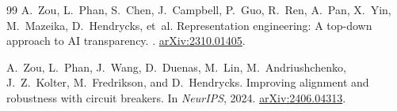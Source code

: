 \documentclass[10pt,twocolumn]{article}
\begin{document}
\begin{thebibliography}{99}
A.~Zou, L.~Phan, S.~Chen, J.~Campbell, P.~Guo, R.~Ren, A.~Pan, X.~Yin, M.~Mazeika, D.~Hendrycks, et~al.
\newblock Representation engineering: A top-down approach to AI transparency.
. \href{https://arxiv.org/abs/2310.01405}{arXiv:2310.01405}.

A.~Zou, L.~Phan, J.~Wang, D.~Duenas, M.~Lin, M.~Andriushchenko, J.~Z.~Kolter, M.~Fredrikson, and D.~Hendrycks.
\newblock Improving alignment and robustness with circuit breakers.
\newblock In \emph{NeurIPS}, 2024. \href{https://arxiv.org/abs/2406.04313}{arXiv:2406.04313}.

\end{thebibliography}
\end{document}
